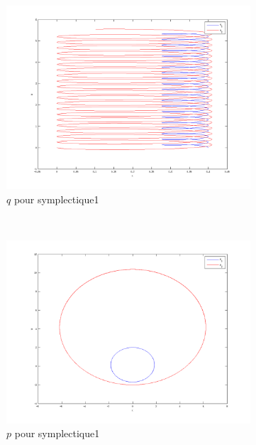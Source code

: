 \begin{figure}
  \begin{subfigure}[b]{0.3\textwidth}
    \includegraphics[width=\textwidth]{images/Q2_symplectique1_q.png}
    \caption{$q$ pour symplectique1}
    \label{fig:q2_symplectique1_q}
  \end{subfigure}%
  ~
  \begin{subfigure}[b]{0.3\textwidth}
    \includegraphics[width=\textwidth]{images/Q2_symplectique1_p.png}
    \caption{$p$ pour symplectique1}
    \label{fig:q2_symplectique1_p}
  \end{subfigure}
  ~
  \begin{subfigure}[b]{0.3\textwidth}

\end{subfigure}
\end{figure}
